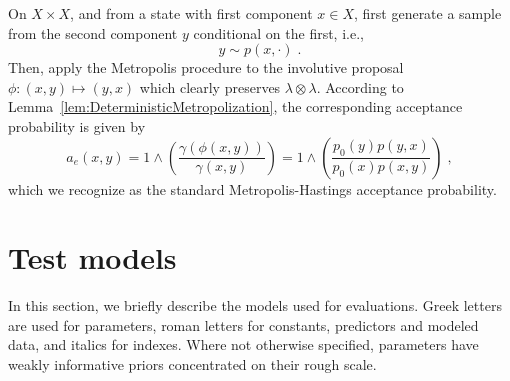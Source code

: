 \documentclass[letterpaper,11pt]{article}
\theoremstyle{plain}%
\theoremstyle{remark}
\begin{document}
On $X \times X$, and from a state with first component $x \in X$, first generate a sample from the second component $y$  conditional on the first, i.e.,  
\[ y \sim p(x, \cdot) \;. \]
Then, apply the Metropolis procedure to the involutive proposal $\phi: (x,y) \mapsto (y,x)$ which clearly preserves $\lambda \otimes \lambda$.
According to Lemma~\ref{lem:DeterministicMetropolization}, the corresponding acceptance probability is given by
\[a_e(x,y) = 1 \wedge \left(\frac{\gamma(\phi(x,y))}{\gamma(x,y)} \right) = 1 \wedge \left(\frac{p_0(y) p(y,x)}{p_0(x) p(x,y)}\right) \; ,
\]
which we recognize as the standard Metropolis-Hastings acceptance probability.   


\section{Test models}

In this section, we briefly describe the models used for evaluations.  Greek letters are used for parameters, roman letters for constants, predictors and modeled data, and italics for indexes.  Where not otherwise specified, parameters have weakly informative priors concentrated on their rough scale.
\end{document}
